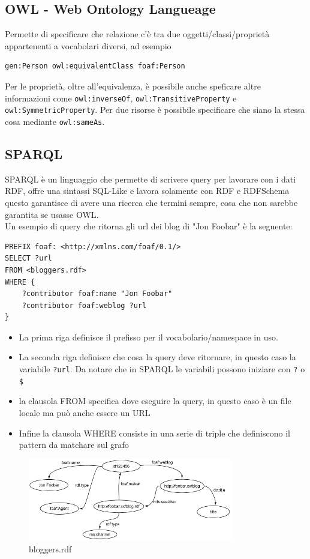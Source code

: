 \subsection{OWL - Web Ontology Langueage}
Permette di specificare che relazione c'è tra due oggetti/classi/proprietà appartenenti a vocabolari diversi, ad esempio
\begin{lstlisting}
gen:Person owl:equivalentClass foaf:Person
\end{lstlisting}
Per le proprietà, oltre all'equivalenza, è possibile anche speficare altre informazioni come \texttt{owl:inverseOf}, \texttt{owl:TransitiveProperty} e \texttt{owl:SymmetricProperty}.
Per due risorse è possibile specificare che siano la stessa cosa mediante \texttt{owl:sameAs}.

\subsection{SPARQL}
SPARQL è un linguaggio che permette di scrivere query per lavorare con i dati RDF, offre una sintassi SQL-Like e lavora solamente con RDF e RDFSchema questo garantisce di avere una ricerca che termini sempre, cosa che non sarebbe garantita se usasse OWL.\\
Un esempio di query che ritorna gli url dei blog di "Jon Foobar" è la seguente:
\begin{lstlisting}
PREFIX foaf: <http://xmlns.com/foaf/0.1/>
SELECT ?url
FROM <bloggers.rdf>
WHERE {
	?contributor foaf:name "Jon Foobar"
	?contributor foaf:weblog ?url
}
\end{lstlisting}
\begin{itemize}
\item La prima riga definisce il prefisso per il vocabolario/namespace in uso.
\item La seconda riga definisce che cosa la query deve ritornare, in questo caso la variabile \texttt{?url}. Da notare che in SPARQL le variabili possono iniziare con \texttt{?} o \texttt{\$}
\item la clausola FROM specifica dove eseguire la query, in questo caso è un file locale ma può anche essere un URL
\item Infine la clausola WHERE consiste in una serie di triple che definiscono il pattern da matchare sul grafo
\end{itemize}
\begin{figure}
\centering
\includegraphics[width=0.8\textwidth]{images/blog_graph.png}
\caption{bloggers.rdf}\label{fig:3}
\end{figure}
